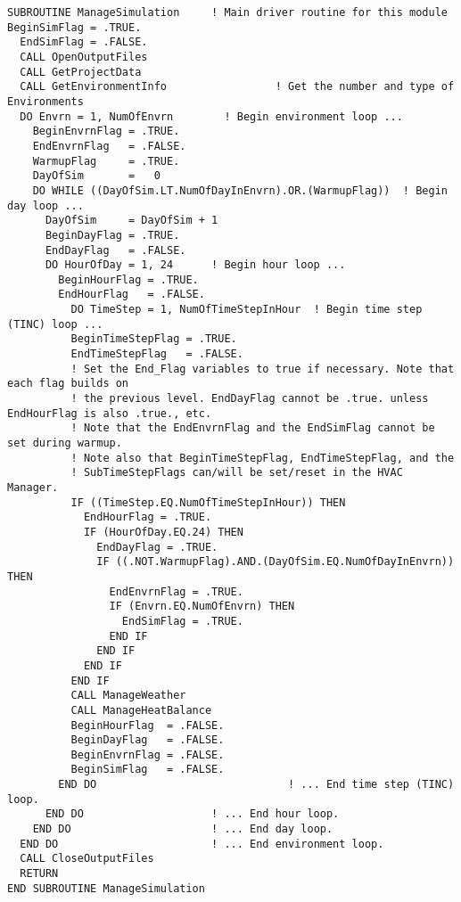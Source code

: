 \begin{lstlisting}
SUBROUTINE ManageSimulation     ! Main driver routine for this module
BeginSimFlag = .TRUE.
  EndSimFlag = .FALSE.
  CALL OpenOutputFiles
  CALL GetProjectData
  CALL GetEnvironmentInfo                 ! Get the number and type of Environments
  DO Envrn = 1, NumOfEnvrn        ! Begin environment loop ...
    BeginEnvrnFlag = .TRUE.
    EndEnvrnFlag   = .FALSE.
    WarmupFlag     = .TRUE.
    DayOfSim       =   0
    DO WHILE ((DayOfSim.LT.NumOfDayInEnvrn).OR.(WarmupFlag))  ! Begin day loop ...
      DayOfSim     = DayOfSim + 1
      BeginDayFlag = .TRUE.
      EndDayFlag   = .FALSE.
      DO HourOfDay = 1, 24      ! Begin hour loop ...
        BeginHourFlag = .TRUE.
        EndHourFlag   = .FALSE.
          DO TimeStep = 1, NumOfTimeStepInHour  ! Begin time step (TINC) loop ...
          BeginTimeStepFlag = .TRUE.
          EndTimeStepFlag   = .FALSE.
          ! Set the End_Flag variables to true if necessary. Note that each flag builds on
          ! the previous level. EndDayFlag cannot be .true. unless EndHourFlag is also .true., etc.
          ! Note that the EndEnvrnFlag and the EndSimFlag cannot be set during warmup.
          ! Note also that BeginTimeStepFlag, EndTimeStepFlag, and the
          ! SubTimeStepFlags can/will be set/reset in the HVAC Manager.
          IF ((TimeStep.EQ.NumOfTimeStepInHour)) THEN
            EndHourFlag = .TRUE.
            IF (HourOfDay.EQ.24) THEN
              EndDayFlag = .TRUE.
              IF ((.NOT.WarmupFlag).AND.(DayOfSim.EQ.NumOfDayInEnvrn)) THEN
                EndEnvrnFlag = .TRUE.
                IF (Envrn.EQ.NumOfEnvrn) THEN
                  EndSimFlag = .TRUE.
                END IF
              END IF
            END IF
          END IF
          CALL ManageWeather
          CALL ManageHeatBalance
          BeginHourFlag  = .FALSE.
          BeginDayFlag   = .FALSE.
          BeginEnvrnFlag = .FALSE.
          BeginSimFlag   = .FALSE.
        END DO                              ! ... End time step (TINC) loop.
      END DO                    ! ... End hour loop.
    END DO                      ! ... End day loop.
  END DO                        ! ... End environment loop.
  CALL CloseOutputFiles
  RETURN
END SUBROUTINE ManageSimulation
\end{lstlisting}
